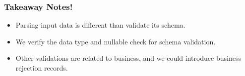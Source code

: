\begin{frame}
	\frametitle{Takeaway Notes!}
	\vspace{2cm}

		\begin{itemize}[<+->]
			\item Parsing input data is different than validate its schema.
			\item We verify the data type and nullable check for schema validation.
			\item Other validations are related to business, and we could introduce business rejection records.
		\end{itemize}
	
\end{frame}



